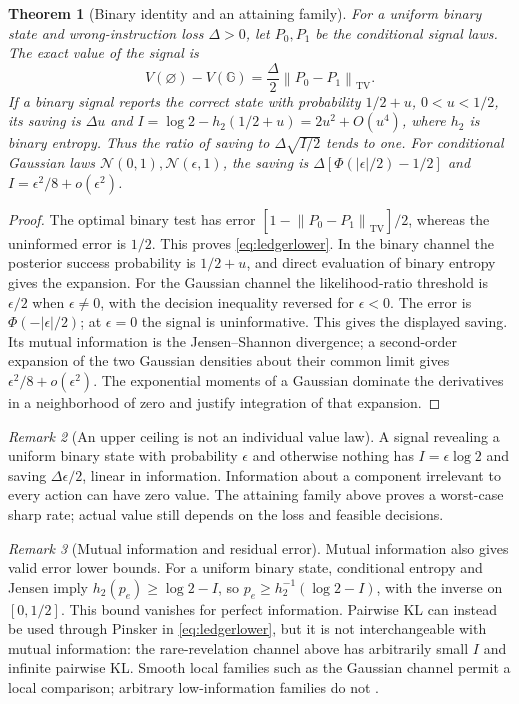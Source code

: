 \documentclass[11pt]{article}
\newcommand{\norm}[1]{\left\lVert #1\right\rVert}
\numberwithin{equation}{section}
\newtheorem{theorem}{Theorem}[section]
\theoremstyle{definition}
\theoremstyle{remark}
\newtheorem{remark}[theorem]{Remark}
\theoremstyle{definition}
\newcommand{\TV}{\operatorname{TV}}
\begin{document}
\begin{theorem}[Binary identity and an attaining family]\label{thm:ledgerlower}
For a uniform binary state and wrong-instruction loss $\Delta>0$, let
$P_0,P_1$ be the conditional signal laws. The exact value of the signal is
\begin{equation}\label{eq:ledgerlower}
 V(\varnothing)-V(\mathbb G)=\frac\Delta2\norm{P_0-P_1}_{\TV}.
\end{equation}
If a binary signal reports the correct state with probability $1/2+u$,
$0<u<1/2$, its saving is $\Delta u$ and
$I=\log2-h_2(1/2+u)=2u^2+O(u^4)$, where $h_2$ is binary entropy.
Thus the ratio of saving to $\Delta\sqrt{I/2}$ tends to one.
For conditional Gaussian laws $\mathcal N(0,1),\mathcal N(\epsilon,1)$,
the saving is $\Delta[\Phi(|\epsilon|/2)-1/2]$ and
$I=\epsilon^2/8+o(\epsilon^2)$.
\end{theorem}
\begin{proof}
The optimal binary test has error
$[1-\norm{P_0-P_1}_{\TV}]/2$, whereas the uninformed error is $1/2$.
This proves \eqref{eq:ledgerlower}. In the binary channel the posterior
success probability is $1/2+u$, and direct evaluation of binary entropy gives
the expansion. For the Gaussian channel the likelihood-ratio threshold is
$\epsilon/2$ when $\epsilon\ne0$, with the decision inequality reversed
for $\epsilon<0$. The error is $\Phi(-|\epsilon|/2)$; at $\epsilon=0$
the signal is uninformative. This gives the displayed saving. Its mutual information is the
Jensen--Shannon divergence; a second-order expansion of the two Gaussian
densities about their common limit gives $\epsilon^2/8+o(\epsilon^2)$.
The exponential moments of a Gaussian dominate the derivatives in a
neighborhood of zero and justify integration of that expansion.
\end{proof}

\begin{remark}[An upper ceiling is not an individual value law]\label{rem:notuniversal}
A signal revealing a uniform binary state with probability $\epsilon$ and
otherwise nothing has $I=\epsilon\log2$ and saving $\Delta\epsilon/2$,
linear in information. Information about a component irrelevant to every
action can have zero value. The attaining family above proves a worst-case
sharp rate; actual value still depends on the loss and feasible decisions.
\end{remark}

\begin{remark}[Mutual information and residual error]\label{rem:currency}
Mutual information also gives valid error lower bounds. For a uniform binary
state, conditional entropy and Jensen imply
$h_2(p_e)\ge\log2-I$, so
$p_e\ge h_2^{-1}(\log2-I)$, with the inverse on $[0,1/2]$.
This bound vanishes for perfect information. Pairwise KL can instead be used
through Pinsker in \eqref{eq:ledgerlower}, but it is not interchangeable with
mutual information: the rare-revelation channel above has arbitrarily small
$I$ and infinite pairwise KL. Smooth local families such as the Gaussian
channel permit a local comparison; arbitrary low-information families do not
\citep{tsybakov2009}.
\end{remark}
\end{document}
